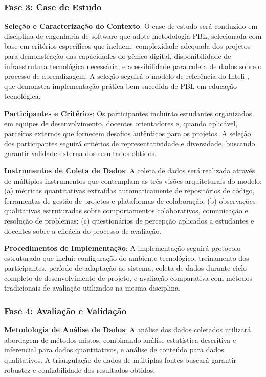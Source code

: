 \documentclass[12pt,a4paper]{article}
\begin{document}
\subsubsection{Fase 3: Case de Estudo}

\textbf{Seleção e Caracterização do Contexto}: O case de estudo será conduzido em disciplina de engenharia de software que adote metodologia PBL, selecionada com base em critérios específicos que incluem: complexidade adequada dos projetos para demonstração das capacidades do gêmeo digital, disponibilidade de infraestrutura tecnológica necessária, e acessibilidade para coleta de dados sobre o processo de aprendizagem. A seleção seguirá o modelo de referência do Inteli \cite{inteli2024}, que demonstra implementação prática bem-sucedida de PBL em educação tecnológica.

\textbf{Participantes e Critérios}: Os participantes incluirão estudantes organizados em equipes de desenvolvimento, docentes orientadores e, quando aplicável, parceiros externos que fornecem desafios autênticos para os projetos. A seleção dos participantes seguirá critérios de representatividade e diversidade, buscando garantir validade externa dos resultados obtidos.

\textbf{Instrumentos de Coleta de Dados}: A coleta de dados será realizada através de múltiplos instrumentos que contemplam as três visões arquiteturais do modelo: (a) métricas quantitativas extraídas automaticamente de repositórios de código, ferramentas de gestão de projetos e plataformas de colaboração; (b) observações qualitativas estruturadas sobre comportamentos colaborativos, comunicação e resolução de problemas; (c) questionários de percepção aplicados a estudantes e docentes sobre a eficácia do processo de avaliação.

\textbf{Procedimentos de Implementação}: A implementação seguirá protocolo estruturado que inclui: configuração do ambiente tecnológico, treinamento dos participantes, período de adaptação ao sistema, coleta de dados durante ciclo completo de desenvolvimento de projeto, e avaliação comparativa com métodos tradicionais de avaliação utilizados na mesma disciplina.

\subsubsection{Fase 4: Avaliação e Validação}

\textbf{Metodologia de Análise de Dados}: A análise dos dados coletados utilizará abordagem de métodos mistos, combinando análise estatística descritiva e inferencial para dados quantitativos, e análise de conteúdo para dados qualitativos. A triangulação de dados de múltiplas fontes buscará garantir robustez e confiabilidade dos resultados obtidos.
\end{document}
